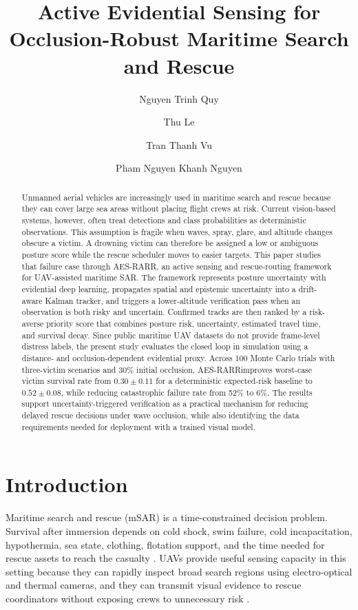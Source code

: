 \documentclass[runningheads]{llncs}
\title{Active Evidential Sensing for Occlusion-Robust Maritime Search and Rescue}
\author{Nguyen Trinh Quy\inst{1} \and Thu Le\inst{1} \and Tran Thanh Vu\inst{1} \and Pham Nguyen Khanh Nguyen\inst{1}}
\institute{FPT University HCM, Ho Chi Minh City, Vietnam}
\newcommand{\aes}{AES-RARR}
\begin{document}
\maketitle

\begin{abstract}
Unmanned aerial vehicles are increasingly used in maritime search and rescue because they can cover large sea areas without placing flight crews at risk. Current vision-based systems, however, often treat detections and class probabilities as deterministic observations. This assumption is fragile when waves, spray, glare, and altitude changes obscure a victim. A drowning victim can therefore be assigned a low or ambiguous posture score while the rescue scheduler moves to easier targets. This paper studies that failure case through \aes, an active sensing and rescue-routing framework for UAV-assisted maritime SAR. The framework represents posture uncertainty with evidential deep learning, propagates spatial and epistemic uncertainty into a drift-aware Kalman tracker, and triggers a lower-altitude verification pass when an observation is both risky and uncertain. Confirmed tracks are then ranked by a risk-averse priority score that combines posture risk, uncertainty, estimated travel time, and survival decay. Since public maritime UAV datasets do not provide frame-level distress labels, the present study evaluates the closed loop in simulation using a distance- and occlusion-dependent evidential proxy. Across 100 Monte Carlo trials with three-victim scenarios and 30\% initial occlusion, \aes improves worst-case victim survival rate from $0.30 \pm 0.11$ for a deterministic expected-risk baseline to $0.52 \pm 0.08$, while reducing catastrophic failure rate from 52\% to 6\%. The results support uncertainty-triggered verification as a practical mechanism for reducing delayed rescue decisions under wave occlusion, while also identifying the data requirements needed for deployment with a trained visual model.
\end{abstract}

\section{Introduction}

Maritime search and rescue (mSAR) is a time-constrained decision problem. Survival after immersion depends on cold shock, swim failure, cold incapacitation, hypothermia, sea state, clothing, flotation support, and the time needed for rescue assets to reach the casualty \cite{golden2002,tipton2011,bierens2016,iamsar2019}. UAVs provide useful sensing capacity in this setting because they can rapidly inspect broad search regions using electro-optical and thermal cameras, and they can transmit visual evidence to rescue coordinators without exposing crews to unnecessary risk \cite{queralta2020,messmer2024holistic}.
\end{document}
